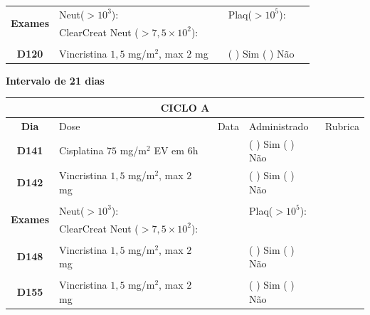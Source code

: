 \documentclass[11pt,a4paper,oldfontcommands]{memoir}
\begin{document}
\begin{center}
\begin{table}[H]
\begin{tabular}{p{1cm}p{6cm}|p{1cm}|p{3cm}|p{2.5cm}}
    \hline
    \multicolumn{1}{c|}{\multirow{2}{*}{\textbf{Exames}}}&\multicolumn{2}{l|}{Neut(\(>10^3\)):}&{Plaq(\(>10^5\)):}&\\
    \cline{2-5}
    \multicolumn{1}{c|}{\multirow{2}{*}{{}}}&\multicolumn{2}{l|}{ClearCreat Neut (\(>7,5\times10^2\)):}&{}&{}\\
    \hline
    \\
    \hline
    \multicolumn{1}{c|}{\multirow{1}{*}{\textbf{D120}}}&{Vincristina \(1,5\) mg/m\(^2\), max \(2\) mg}&&{(  ) Sim (  ) Não}&\\
    \hline
\end{tabular}
\end{table}
\textbf{Intervalo de 21 dias}
\begin{table}[H]
\begin{tabular}{p{1cm}p{6cm}|p{1cm}|p{3cm}|p{2.5cm}}
	\hline
	\multicolumn{5}{c}{\textbf{CICLO A}}\\
\hline
    \multicolumn{1}{c|}{\multirow{1}{*}{\textbf{Dia}}}&{Dose}&{Data}&{Administrado}&{Rubrica} \\
    \hline
    \multicolumn{1}{c|}{\multirow{1}{*}{\textbf{D141}}}&{Cisplatina \(75\) mg/m\(^2\) EV em 6h}&&{(  ) Sim (  ) Não}&\\
    \multicolumn{1}{c|}{\multirow{1}{*}{\textbf{D142}}}&{Vincristina \(1,5\) mg/m\(^2\), max \(2\) mg}&&{(  ) Sim (  ) Não}&\\
    \multicolumn{1}{c|}{\multirow{1}{*}{\textbf{}}}&&&&\\
    \hline
    \multicolumn{1}{c|}{\multirow{2}{*}{\textbf{Exames}}}&\multicolumn{2}{l|}{Neut(\(>10^3\)):}&{Plaq(\(>10^5\)):}&\\
    \cline{2-5}
    \multicolumn{1}{c|}{\multirow{2}{*}{{}}}&\multicolumn{2}{l|}{ClearCreat Neut (\(>7,5\times10^2\)):}&{}&{}\\
    \hline
    \\
    \hline
    \multicolumn{1}{c|}{\multirow{1}{*}{\textbf{D148}}}&{Vincristina \(1,5\) mg/m\(^2\), max \(2\) mg}&&{(  ) Sim (  ) Não}&\\
    \hline
    \\
    \hline
    \multicolumn{1}{c|}{\multirow{1}{*}{\textbf{D155}}}&{Vincristina \(1,5\) mg/m\(^2\), max \(2\) mg}&&{(  ) Sim (  ) Não}&\\
    \hline
    \end{tabular}
    \end{table}


\end{center}
\end{document}
